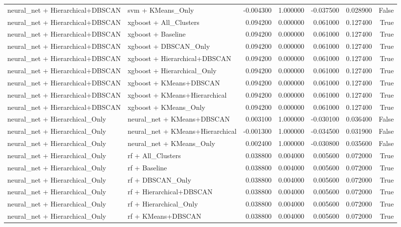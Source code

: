 \begin{tabular}{llrrrrr}
neural_net + Hierarchical+DBSCAN & svm + KMeans_Only & -0.004300 & 1.000000 & -0.037500 & 0.028900 & False \\
neural_net + Hierarchical+DBSCAN & xgboost + All_Clusters & 0.094200 & 0.000000 & 0.061000 & 0.127400 & True \\
neural_net + Hierarchical+DBSCAN & xgboost + Baseline & 0.094200 & 0.000000 & 0.061000 & 0.127400 & True \\
neural_net + Hierarchical+DBSCAN & xgboost + DBSCAN_Only & 0.094200 & 0.000000 & 0.061000 & 0.127400 & True \\
neural_net + Hierarchical+DBSCAN & xgboost + Hierarchical+DBSCAN & 0.094200 & 0.000000 & 0.061000 & 0.127400 & True \\
neural_net + Hierarchical+DBSCAN & xgboost + Hierarchical_Only & 0.094200 & 0.000000 & 0.061000 & 0.127400 & True \\
neural_net + Hierarchical+DBSCAN & xgboost + KMeans+DBSCAN & 0.094200 & 0.000000 & 0.061000 & 0.127400 & True \\
neural_net + Hierarchical+DBSCAN & xgboost + KMeans+Hierarchical & 0.094200 & 0.000000 & 0.061000 & 0.127400 & True \\
neural_net + Hierarchical+DBSCAN & xgboost + KMeans_Only & 0.094200 & 0.000000 & 0.061000 & 0.127400 & True \\
neural_net + Hierarchical_Only & neural_net + KMeans+DBSCAN & 0.003100 & 1.000000 & -0.030100 & 0.036400 & False \\
neural_net + Hierarchical_Only & neural_net + KMeans+Hierarchical & -0.001300 & 1.000000 & -0.034500 & 0.031900 & False \\
neural_net + Hierarchical_Only & neural_net + KMeans_Only & 0.002400 & 1.000000 & -0.030800 & 0.035600 & False \\
neural_net + Hierarchical_Only & rf + All_Clusters & 0.038800 & 0.004000 & 0.005600 & 0.072000 & True \\
neural_net + Hierarchical_Only & rf + Baseline & 0.038800 & 0.004000 & 0.005600 & 0.072000 & True \\
neural_net + Hierarchical_Only & rf + DBSCAN_Only & 0.038800 & 0.004000 & 0.005600 & 0.072000 & True \\
neural_net + Hierarchical_Only & rf + Hierarchical+DBSCAN & 0.038800 & 0.004000 & 0.005600 & 0.072000 & True \\
neural_net + Hierarchical_Only & rf + Hierarchical_Only & 0.038800 & 0.004000 & 0.005600 & 0.072000 & True \\
neural_net + Hierarchical_Only & rf + KMeans+DBSCAN & 0.038800 & 0.004000 & 0.005600 & 0.072000 & True \\

\end{tabular}
